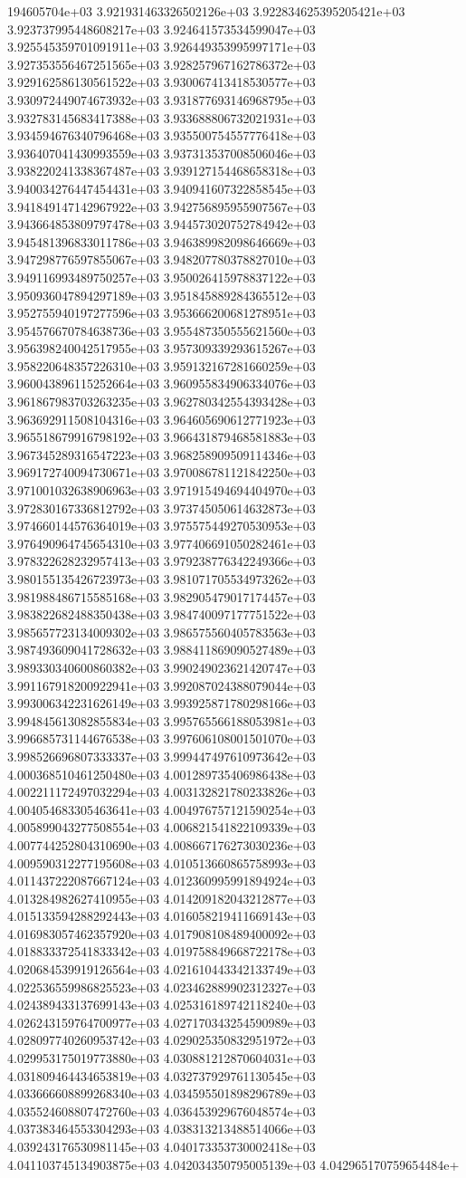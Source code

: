 194605704e+03	3.921931463326502126e+03	3.922834625395205421e+03	3.923737995448608217e+03	3.924641573534599047e+03	3.925545359701091911e+03	3.926449353995997171e+03	3.927353556467251565e+03	3.928257967162786372e+03	3.929162586130561522e+03	3.930067413418530577e+03	3.930972449074673932e+03	3.931877693146968795e+03	3.932783145683417388e+03	3.933688806732021931e+03	3.934594676340796468e+03	3.935500754557776418e+03	3.936407041430993559e+03	3.937313537008506046e+03	3.938220241338367487e+03	3.939127154468658318e+03	3.940034276447454431e+03	3.940941607322858545e+03	3.941849147142967922e+03	3.942756895955907567e+03	3.943664853809797478e+03	3.944573020752784942e+03	3.945481396833011786e+03	3.946389982098646669e+03	3.947298776597855067e+03	3.948207780378827010e+03	3.949116993489750257e+03	3.950026415978837122e+03	3.950936047894297189e+03	3.951845889284365512e+03	3.952755940197277596e+03	3.953666200681278951e+03	3.954576670784638736e+03	3.955487350555621560e+03	3.956398240042517955e+03	3.957309339293615267e+03	3.958220648357226310e+03	3.959132167281660259e+03	3.960043896115252664e+03	3.960955834906334076e+03	3.961867983703263235e+03	3.962780342554393428e+03	3.963692911508104316e+03	3.964605690612771923e+03	3.965518679916798192e+03	3.966431879468581883e+03	3.967345289316547223e+03	3.968258909509114346e+03	3.969172740094730671e+03	3.970086781121842250e+03	3.971001032638906963e+03	3.971915494694404970e+03	3.972830167336812792e+03	3.973745050614632873e+03	3.974660144576364019e+03	3.975575449270530953e+03	3.976490964745654310e+03	3.977406691050282461e+03	3.978322628232957413e+03	3.979238776342249366e+03	3.980155135426723973e+03	3.981071705534973262e+03	3.981988486715585168e+03	3.982905479017174457e+03	3.983822682488350438e+03	3.984740097177751522e+03	3.985657723134009302e+03	3.986575560405783563e+03	3.987493609041728632e+03	3.988411869090527489e+03	3.989330340600860382e+03	3.990249023621420747e+03	3.991167918200922941e+03	3.992087024388079044e+03	3.993006342231626149e+03	3.993925871780298166e+03	3.994845613082855834e+03	3.995765566188053981e+03	3.996685731144676538e+03	3.997606108001501070e+03	3.998526696807333337e+03	3.999447497610973642e+03	4.000368510461250480e+03	4.001289735406986438e+03	4.002211172497032294e+03	4.003132821780233826e+03	4.004054683305463641e+03	4.004976757121590254e+03	4.005899043277508554e+03	4.006821541822109339e+03	4.007744252804310690e+03	4.008667176273030236e+03	4.009590312277195608e+03	4.010513660865758993e+03	4.011437222087667124e+03	4.012360995991894924e+03	4.013284982627410955e+03	4.014209182043212877e+03	4.015133594288292443e+03	4.016058219411669143e+03	4.016983057462357920e+03	4.017908108489400092e+03	4.018833372541833342e+03	4.019758849668722178e+03	4.020684539919126564e+03	4.021610443342133749e+03	4.022536559986825523e+03	4.023462889902312327e+03	4.024389433137699143e+03	4.025316189742118240e+03	4.026243159764700977e+03	4.027170343254590989e+03	4.028097740260953742e+03	4.029025350832951972e+03	4.029953175019773880e+03	4.030881212870604031e+03	4.031809464434653819e+03	4.032737929761130545e+03	4.033666608899268340e+03	4.034595501898296789e+03	4.035524608807472760e+03	4.036453929676048574e+03	4.037383464553304293e+03	4.038313213488514066e+03	4.039243176530981145e+03	4.040173353730002418e+03	4.041103745134903875e+03	4.042034350795005139e+03	4.042965170759654484e+
